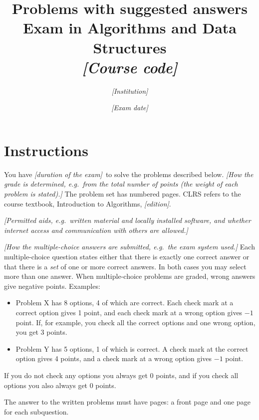 \documentclass[12pt]{article}
\newcommand{\placeholder}[1]{\textit{[#1]}}
\newcommand{\examdate}{\placeholder{Exam date}}
\newcommand{\examduration}{\placeholder{duration of the exam}}
\newcommand{\problemfile}{ad-problems-2026-june} %
\newcounter{answerpage}
\newcommand{\withanswers}{{\bf Problems with suggested answers}\\}
\newcommand{\withanswers}{}
\begin{document}
\title{\Large \withanswers Exam in Algorithms and Data Structures\\
{\small \placeholder{Course code}}}

\author{\placeholder{Institution}}
\date{\examdate}

\maketitle

\section*{Instructions}

You have \examduration\ to solve the  problems described below.
\placeholder{How the grade is determined, e.g.\ from the total number of points (the weight of each problem is stated).}
The problem set has \pageref{page:last} numbered pages.
CLRS refers to the course textbook, Introduction to Algorithms, \placeholder{edition}.

\medskip

\placeholder{Permitted aids, e.g.\ written material and locally installed software, and whether internet access and communication with others are allowed.}

\medskip

\placeholder{How the multiple-choice answers are submitted, e.g.\ the exam system used.}
Each multiple-choice question states either that there is exactly one correct answer or that there is a \emph{set} of one or more correct answers.
In both cases you may select more than one answer.
When multiple-choice problems are graded, wrong answers give negative points.
Examples:
\begin{itemize}
\item Problem X has 8 options, 4 of which are correct.
Each check mark at a correct option gives 1 point, and each check mark at a wrong option gives $-1$ point.
If, for example, you check all the correct options and one wrong option, you get 3 points.
\item Problem Y has 5 options, 1 of which is correct.
A check mark at the correct option gives 4 points, and a check mark at a wrong option gives $-1$ point.
\end{itemize}
If you do not check any options you always get 0 points, and if you check all options you also always get 0 points.

\medskip

The answer to the written problems must have  pages: a front page and one page for each subquestion.

\newpage


\end{document}
